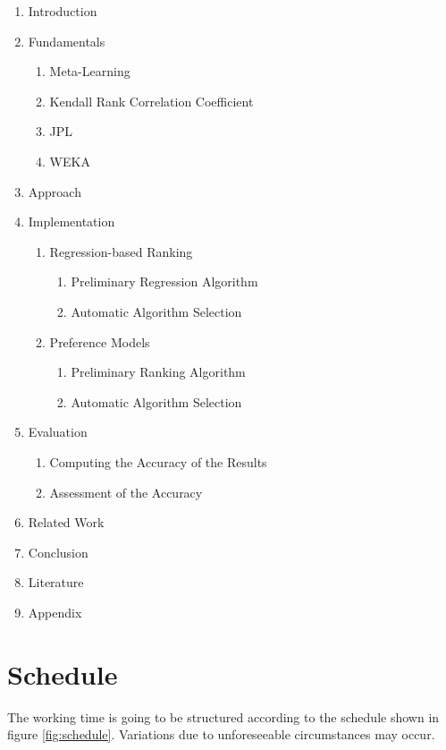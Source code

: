\documentclass[12pt]{scrartcl}
\begin{document}
\begin{enumerate}
	\item Introduction
	\item Fundamentals
	\begin{enumerate}
		\item Meta-Learning
		\item Kendall Rank Correlation Coefficient
		\item JPL
		\item WEKA
	\end{enumerate}
	\item Approach
	\item Implementation
	\begin{enumerate} 
		\item Regression-based Ranking
		\begin{enumerate}
			\item Preliminary Regression Algorithm
			\item Automatic Algorithm Selection
		\end{enumerate}
		\item Preference Models
		\begin{enumerate}
			\item Preliminary Ranking Algorithm
			\item Automatic Algorithm Selection
		\end{enumerate}
	\end{enumerate}
	\item Evaluation
	\begin{enumerate}
		\item Computing the Accuracy of the Results
		\item Assessment of the Accuracy
	\end{enumerate}
	\item Related Work
	\item Conclusion
	\item Literature
	\item Appendix
\end{enumerate}


\newpage
\section{Schedule}\label{sec:schedule}
The working time is going to be structured according to the schedule shown in figure \ref{fig:schedule}. Variations due to unforeseeable circumstances may occur.
\end{document}
